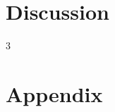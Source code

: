 \documentclass[danish ,a4paper,12pt]{article}
\begin{document}
\section{Discussion} \label{sec:discussion}
3
\pagebreak

 \renewcommand{\bibsection}{\section{Bibliography}}


\pagebreak

\appendix
{}


\section{Appendix} \label{sec:appendix}

\pagebreak
\end{document}
